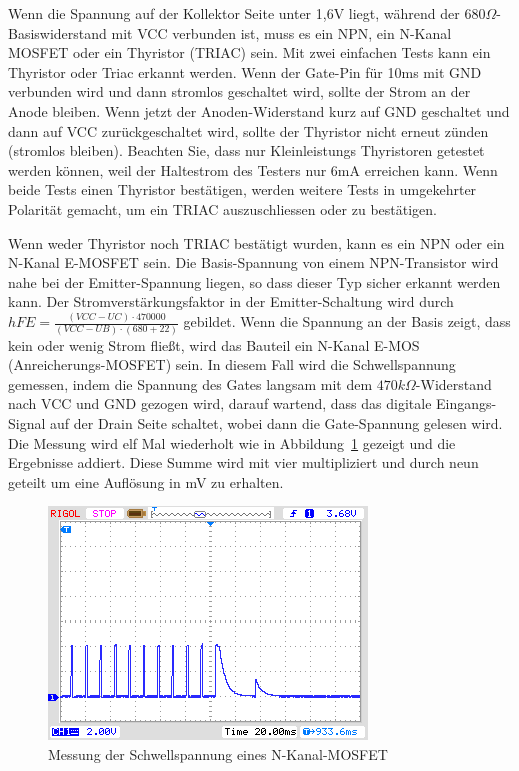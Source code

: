 Wenn die Spannung auf der Kollektor Seite unter 1,6V liegt, während der \(680\Omega\)-Basiswiderstand mit
VCC verbunden ist, muss es ein NPN, ein N-Kanal MOSFET oder ein Thyristor (TRIAC) sein.
Mit zwei einfachen Tests kann ein Thyristor oder Triac erkannt werden.
Wenn der Gate-Pin für 10ms mit GND verbunden wird und dann stromlos geschaltet wird, sollte
der Strom an der Anode bleiben.
Wenn jetzt der Anoden-Widerstand kurz auf GND geschaltet und dann auf VCC zurückgeschaltet wird,
sollte der Thyristor nicht erneut zünden (stromlos bleiben).
Beachten Sie, dass nur Kleinleistungs Thyristoren getestet werden können, weil der Haltestrom des
Testers nur 6mA erreichen kann.
Wenn beide Tests einen Thyristor bestätigen, werden weitere Tests in umgekehrter Polarität gemacht,
um ein TRIAC auszuschliessen oder zu bestätigen.

Wenn weder Thyristor noch TRIAC bestätigt wurden, kann es ein NPN oder ein N-Kanal E-MOSFET sein.
Die Basis-Spannung von einem NPN-Transistor wird nahe bei der Emitter-Spannung liegen, so dass dieser Typ sicher
erkannt werden kann.
Der Stromverstärkungsfaktor in der Emitter-Schaltung wird durch \(hFE = \frac{(VCC-UC)\cdot 470000}{(VCC-UB)\cdot (680+22)}\) 
gebildet.
Wenn die Spannung an der Basis zeigt, dass kein oder wenig Strom fließt, wird das Bauteil ein N-Kanal E-MOS
(Anreicherungs-MOSFET) sein. In diesem Fall wird die Schwellspannung gemessen, indem die Spannung des Gates langsam mit
dem \(470k\Omega\)-Widerstand nach VCC und GND gezogen wird, darauf wartend, dass das digitale
Eingangs-Signal auf der Drain Seite schaltet, wobei dann die Gate-Spannung gelesen wird.
Die Messung wird elf Mal wiederholt wie in Abbildung~\ref{fig:eleven} gezeigt und die Ergebnisse addiert.
Diese Summe wird mit vier multipliziert und durch neun geteilt um eine Auflösung in mV zu erhalten.
\begin{figure}[H]
\centering
\includegraphics[]{../PNG/IRFU120gate.png}
\caption{Messung der Schwellspannung eines N-Kanal-MOSFET}
\label{fig:eleven}
\end{figure}

